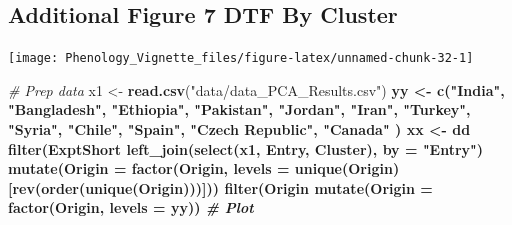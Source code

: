 \documentclass[
]{article}
\newenvironment{Shaded}{\begin{snugshade}}{\end{snugshade}}
\newcommand{\CommentTok}[1]{\textcolor[rgb]{0.56,0.35,0.01}{\textit{#1}}}
\newcommand{\DataTypeTok}[1]{\textcolor[rgb]{0.13,0.29,0.53}{#1}}
\newcommand{\KeywordTok}[1]{\textcolor[rgb]{0.13,0.29,0.53}{\textbf{#1}}}
\newcommand{\NormalTok}[1]{#1}
\newcommand{\OperatorTok}[1]{\textcolor[rgb]{0.81,0.36,0.00}{\textbf{#1}}}
\newcommand{\StringTok}[1]{\textcolor[rgb]{0.31,0.60,0.02}{#1}}
\begin{document}
\hypertarget{additional-figure-7-dtf-by-cluster}{%
\subsection{Additional Figure 7 DTF By
Cluster}\label{additional-figure-7-dtf-by-cluster}}

\texttt{[image: Phenology\_Vignette\_files/figure-latex/unnamed-chunk-32-1]}

\begin{Shaded}
\begin{Highlighting}[]
\CommentTok{# Prep data}
\NormalTok{x1 <-}\StringTok{ }\KeywordTok{read.csv}\NormalTok{(}\StringTok{"data/data_PCA_Results.csv"}\NormalTok{) }\OperatorTok{%
\NormalTok{yy <-}\StringTok{ }\KeywordTok{c}\NormalTok{(}\StringTok{"India"}\NormalTok{, }\StringTok{"Bangladesh"}\NormalTok{, }\StringTok{"Ethiopia"}\NormalTok{, }\StringTok{"Pakistan"}\NormalTok{, }\StringTok{"Jordan"}\NormalTok{,}
        \StringTok{"Iran"}\NormalTok{, }\StringTok{"Turkey"}\NormalTok{, }\StringTok{"Syria"}\NormalTok{, }\StringTok{"Chile"}\NormalTok{, }\StringTok{"Spain"}\NormalTok{, }\StringTok{"Czech Republic"}\NormalTok{, }\StringTok{"Canada"}\NormalTok{ )}
\NormalTok{xx <-}\StringTok{ }\NormalTok{dd }\OperatorTok{%
\StringTok{  }\KeywordTok{filter}\NormalTok{(ExptShort }\OperatorTok{%
\StringTok{  }\KeywordTok{left_join}\NormalTok{(}\KeywordTok{select}\NormalTok{(x1, Entry, Cluster), }\DataTypeTok{by =} \StringTok{"Entry"}\NormalTok{) }\OperatorTok{%
\StringTok{  }\KeywordTok{mutate}\NormalTok{(}\DataTypeTok{Origin =} \KeywordTok{factor}\NormalTok{(Origin, }\DataTypeTok{levels =} \KeywordTok{unique}\NormalTok{(Origin)[}\KeywordTok{rev}\NormalTok{(}\KeywordTok{order}\NormalTok{(}\KeywordTok{unique}\NormalTok{(Origin)))])) }\OperatorTok{%
\StringTok{  }\KeywordTok{filter}\NormalTok{(Origin }\OperatorTok{%
\StringTok{  }\KeywordTok{mutate}\NormalTok{(}\DataTypeTok{Origin =} \KeywordTok{factor}\NormalTok{(Origin, }\DataTypeTok{levels =}\NormalTok{ yy))}
\CommentTok{# Plot}
}}}}}}
\end{Highlighting}
\end{Shaded}
\end{document}
